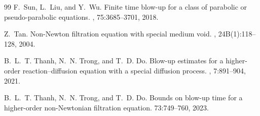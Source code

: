 \documentclass[12pt,reqno]{amsart}
\theoremstyle{definition}
\theoremstyle{remark}
\numberwithin{equation}{section}
\begin{document}
\begin{thebibliography}{99}
F.~Sun, L.~Liu, and Y.~Wu.
\newblock Finite time blow-up for a class of parabolic or pseudo-parabolic
equations.
, 75:3685--3701,
2018.

Z.~Tan.
\newblock Non-Newton filtration equation with special medium void.
, 24B(1):118--128, 2004.

B.~L.~T. Thanh, N.~N. Trong, and T.~D. Do.
\newblock Blow-up estimates for a higher-order reaction–diffusion equation with a special diffusion process. 
, 7:891--904, 2021.

B.~L.~T. Thanh, N.~N. Trong, and T.~D. Do.
\newblock Bounds on blow-up time for a higher-order non-Newtonian filtration equation. 
 73:749--760, 2023.
\end{thebibliography}
\end{document}
